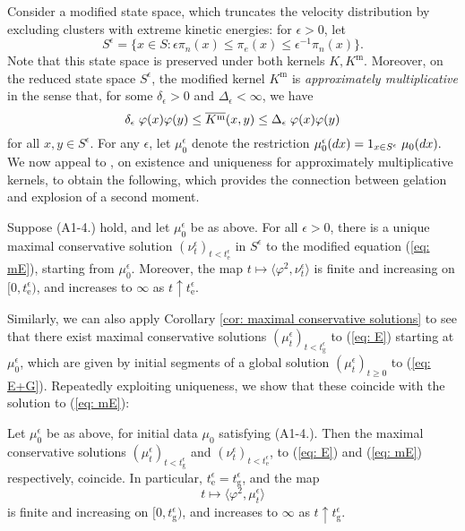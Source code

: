 Consider a modified state space, which truncates the velocity distribution by excluding clusters with extreme kinetic energies: for $\epsilon>0$, let \begin{equation}
    S^\epsilon= \{x\in S: \epsilon \pi_n(x) \leq \pi_e(x) \leq \epsilon^{-1} \pi_n(x)\}.
\end{equation} Note that this state space is preserved under both kernels $K, K^\mathrm{m}$. Moreover, on the reduced state space $S^\epsilon$, the modified kernel $K^\mathrm{m}$ is \emph{approximately multiplicative} \cite{N00} in the sense that, for some $\delta_\epsilon>0$ and $\Delta_\epsilon<\infty$, we have \begin{equation}
    \delta_\epsilon\hspace{0.1cm}\varphi(x)\varphi(y) \leq \overline{K^\mathrm{m}}(x,y) \leq  \Delta_\epsilon\hspace{0.1cm}\varphi(x)\varphi(y)
\end{equation}for all $x,y \in S^\epsilon$. For any $\epsilon$, let $\mu_0^\epsilon$ denote the restriction $\mu_0^\epsilon(dx)=1_{x\in S^\epsilon}\hspace{0.1cm}\mu_0(dx).$ We now appeal to \cite[Theorem 2.2]{N00}, on existence and uniqueness for approximately multiplicative kernels, to obtain the following, which provides the connection between gelation and explosion of a second moment.
\begin{lemma}\label{lemma: solution to modified equation}
    Suppose (A1-4.) hold, and let $\mu^\epsilon_0$ be as above. For all $\epsilon>0$, there is a unique maximal conservative solution  $(\nu^\epsilon_t)_{t< t_\mathrm{e}^\epsilon}$ in $S^\epsilon$ to the modified equation (\ref{eq: mE}), starting from $\mu_0^\epsilon$. Moreover, the map $t\mapsto \langle \varphi^2, \nu^\epsilon_t\rangle$ is finite and increasing on $[0,t_\mathrm{e}^\epsilon)$, and increases to $\infty$ as $t\uparrow t_\mathrm{e}^\epsilon$. 
\end{lemma}

Similarly, we can also apply Corollary \ref{cor: maximal conservative solutions} to see that there exist maximal conservative solutions $(\mu^\epsilon_t)_{t<t_\mathrm{g}^\epsilon}$ to (\ref{eq: E}) starting at $\mu^\epsilon_0$, which are given by initial segments of a global solution $(\mu^\epsilon_t)_{t\geq 0}$ to (\ref{eq: E+G}). Repeatedly exploiting uniqueness, we show that these coincide with the solution to (\ref{eq: mE}):

\begin{lemma}\label{lemma: Relationship}
Let $\mu^\epsilon_0$ be as above, for initial data $\mu_0$ satisfying ({A1}-4.).  Then the maximal conservative solutions $(\mu^\epsilon_t)_{t<t_\mathrm{g}^\epsilon}$ and $(\nu^\epsilon_t)_{t<t_\mathrm{e}^\epsilon}$, to (\ref{eq: E}) and (\ref{eq: mE}) respectively, coincide. In particular, $t_\mathrm{e}^\epsilon = t^\epsilon_\mathrm{g}$, and the map \begin{equation}
    t\mapsto \langle \varphi^2, \mu^\epsilon_t\rangle
\end{equation} is finite and increasing on $[0, t_\mathrm{g}^\epsilon)$, and increases to $\infty$ as $t\uparrow t_\mathrm{g}^\epsilon.$ \end{lemma}

